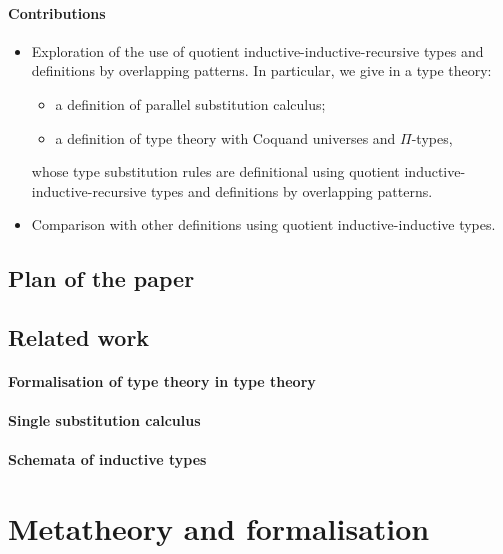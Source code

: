 \documentclass[a4paper,UKenglish,numberwithinsect,cleveref,thm-restate]{lipics-v2021}
\begin{document}
\paragraph*{Contributions}
\begin{itemize}
  \item Exploration of the use of quotient inductive-inductive-recursive types and definitions by overlapping patterns.
    In particular, we give in a type theory:
    \begin{itemize}
      \item a definition of parallel substitution calculus;
      \item a definition of type theory with Coquand universes and $\Pi$-types,
    \end{itemize}
   whose type substitution rules are definitional using quotient inductive-inductive-recursive types and definitions by overlapping patterns.
  \item Comparison with other definitions using quotient inductive-inductive types.
\end{itemize}


\subsection{Plan of the paper}
\subsection{Related work}
\paragraph*{Formalisation of type theory in type theory}
\cite{Danielsson2006,Altenkirch2016a}
\cite{Altenkirch2017}

\paragraph*{Single substitution calculus}
\cite{Kaposi2023,Kaposi2024a}
\paragraph*{Schemata of inductive types}
\cite{Kaposi2019}
\cite{Dybjer2003,Dybjer2000,Dybjer1999}

\section{Metatheory and formalisation}
\cite{Pujet2022,Pujet2024,Pujet2022a}
\end{document}
